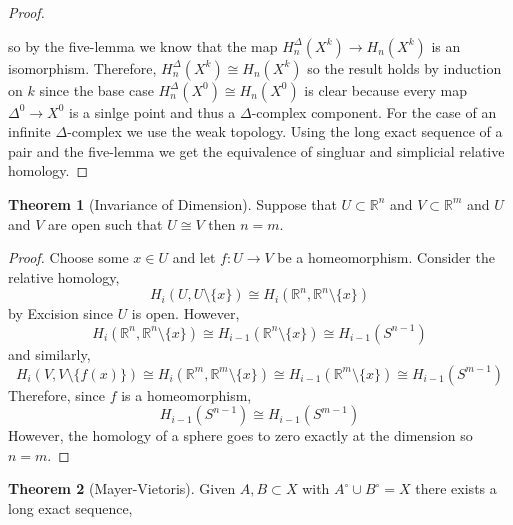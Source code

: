 \documentclass[12pt]{extarticle}
\newcommand{\R}{\mathbb{R}}
\theoremstyle{definition}
\newtheorem{theorem}{Theorem}[section]
\begin{document}
\begin{proof}
\begin{center}
\end{center}
so by the five-lemma we know that the map $H_n^\Delta(X^k) \to H_n(X^k)$ is an isomorphism. Therefore, $H_n^\Delta(X^k) \cong H_n(X^k)$ so the result holds by induction on $k$ since the base case $H_n^\Delta(X^0) \cong H_n(X^0)$ is clear because every map $\Delta^0 \to X^0$ is a sinlge point and thus a $\Delta$-complex component. For the case of an infinite $\Delta$-complex we use the weak topology. Using the long exact sequence of a pair and the five-lemma we get the equivalence of singluar and simplicial relative homology. 
\end{proof}

\begin{theorem}[Invariance of Dimension]
Suppose that $U \subset \R^n$ and $V \subset \R^m$ and $U$ and $V$ are open such that $U \cong V$ then $n = m$.
\end{theorem}

\begin{proof}
Choose some $x \in U$ and let $f : U \to V$ be a homeomorphism. Consider the relative homology,
\[ H_i(U, U \setminus \{ x \}) \cong H_i(\R^n, \R^n \setminus \{x\}) \]
by Excision since $U$ is open. However,
\[ H_i(\R^n, \R^n \setminus \{x\}) \cong H_{i-1}(\R^n \setminus \{x\}) \cong H_{i-1}(S^{n-1}) \]
and similarly,  
\[H_i(V, V \setminus \{ f(x) \}) \cong H_i(\R^m, \R^m \setminus \{x\}) \cong H_{i-1}(\R^m \setminus \{x\}) \cong H_{i-1}(S^{m-1}) \]
Therefore, since $f$ is a homeomorphism,
\[ H_{i-1}(S^{n-1}) \cong H_{i-1}(S^{m-1}) \]
However, the homology of a sphere goes to zero exactly at the dimension so $n = m$.
\end{proof}

\begin{theorem}[Mayer-Vietoris]
Given $A, B \subset X$ with $A^\circ \cup B^\circ = X$ there exists a long exact sequence,
\begin{center}
\end{center}
\end{theorem}
\end{document}
